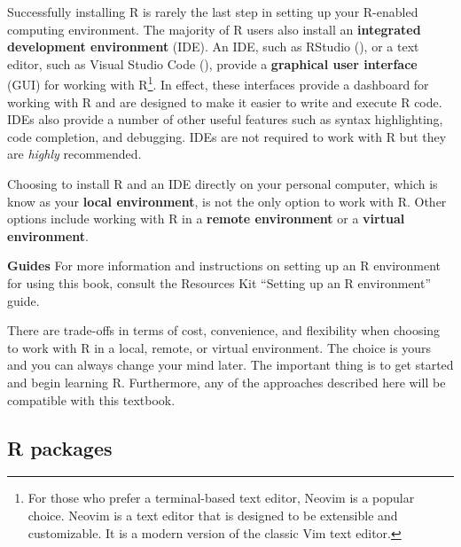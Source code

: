 \documentclass[
  letterpaper,
  krantz1]{latex/krantz-mod}
\theoremstyle{definition}
\theoremstyle{definition}
\theoremstyle{remark}
\begin{document}
Successfully installing R is rarely the last step in setting up your
R-enabled computing environment. The majority of R users also install an
\textbf{integrated
development environment} (IDE). An IDE, such as RStudio
(), or a text
editor, such as Visual Studio Code
(), provide a
\textbf{graphical user interface}
(GUI) for working with R\footnote{For those who prefer a terminal-based
  text editor, Neovim is a popular choice. Neovim is a
  text editor that is designed to be extensible and customizable. It is
  a modern version of the classic Vim text editor.}. In effect, these
interfaces provide a dashboard for working with R and are designed to
make it easier to write and execute R code. IDEs also provide a number
of other useful features such as syntax highlighting, code completion,
and debugging. IDEs are not required to work with R but they are
\emph{highly} recommended.

Choosing to install R and an IDE directly on your personal computer,
which is know as your \textbf{local
environment}, is not the only option to work with R. Other options
include working with R in a \textbf{remote
environment} or a \textbf{virtual
environment}.

\begin{tcolorbox}[enhanced jigsaw, toprule=.15mm, breakable, colback=white, arc=.35mm, left=2mm, colframe=quarto-callout-color-frame, opacityback=0, bottomrule=.15mm, rightrule=.15mm, leftrule=.75mm]

\textbf{ Guides} For more information and instructions
on setting up an R environment for using this book, consult the
Resources Kit ``Setting up an R environment'' guide.

\end{tcolorbox}

There are trade-offs in terms of cost, convenience, and flexibility when
choosing to work with R in a local, remote, or virtual environment. The
choice is yours and you can always change your mind later. The important
thing is to get started and begin learning R. Furthermore, any of the
approaches described here will be compatible with this textbook.

\subsection*{R packages}\label{sec-preface-r-packages}
\end{document}
